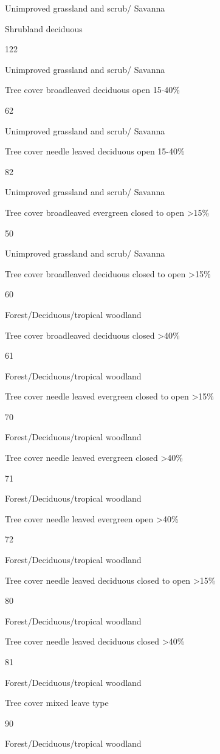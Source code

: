 \documentclass[
  10pt,
  b5paper,
]{book}
\begin{document}
Unimproved grassland and scrub/ Savanna

Shrubland deciduous

122

Unimproved grassland and scrub/ Savanna

Tree cover broadleaved deciduous open 15-40\%

62

Unimproved grassland and scrub/ Savanna

Tree cover needle leaved deciduous open 15-40\%

82

Unimproved grassland and scrub/ Savanna

Tree cover broadleaved evergreen closed to open \textgreater15\%

50

Unimproved grassland and scrub/ Savanna

Tree cover broadleaved deciduous closed to open \textgreater15\%

60

Forest/Deciduous/tropical woodland

Tree cover broadleaved deciduous closed \textgreater40\%

61

Forest/Deciduous/tropical woodland

Tree cover needle leaved evergreen closed to open \textgreater15\%

70

Forest/Deciduous/tropical woodland

Tree cover needle leaved evergreen closed \textgreater40\%

71

Forest/Deciduous/tropical woodland

Tree cover needle leaved evergreen open \textgreater40\%

72

Forest/Deciduous/tropical woodland

Tree cover needle leaved deciduous closed to open \textgreater15\%

80

Forest/Deciduous/tropical woodland

Tree cover needle leaved deciduous closed \textgreater40\%

81

Forest/Deciduous/tropical woodland

Tree cover mixed leave type

90

Forest/Deciduous/tropical woodland
\end{document}
